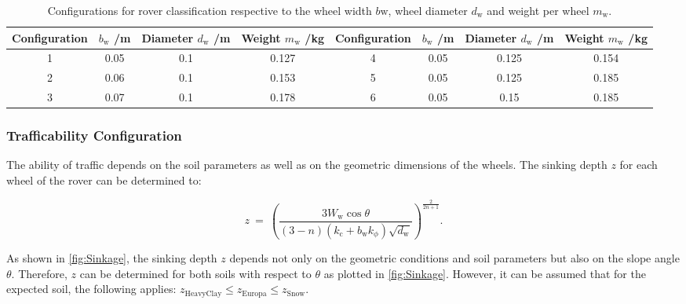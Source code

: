 \begin{table}[htb]
\centering
\caption{Configurations for rover classification respective to the wheel width \(b\text{w}\), wheel diameter \(d_\text{w}\) and weight per wheel \(m_\text{w}\).}
\begin{adjustbox}{max width=\textwidth}
\begin{tabular}{cccc|cccc}

	\toprule
		\multicolumn{1}{l}{Configuration} & \multicolumn{1}{c}{\(b_\text{w}\) /m} & \multicolumn{1}{c}{Diameter \(d_\text{w}\) /m} & \multicolumn{1}{c|}{Weight \(m_\text{w}\) /kg} &  \multicolumn{1}{l}{Configuration} & \multicolumn{1}{c}{\(b_\text{w}\) /m} & \multicolumn{1}{c}{Diameter \(d_\text{w}\) /m} & \multicolumn{1}{c}{Weight \(m_\text{w}\) /kg}  \\

	\midrule
		
		1	&	0.05	&	0.1		&	0.127		& 	4	&	0.05	&	0.125	&	0.154	\\
		2	&	0.06	&	0.1		&	0.153		&	5	&	0.05	&	0.125	&	0.185	\\
		3	&	0.07	&	0.1		&	0.178		& 	6	&	0.05	&	0.15	&	0.185	\\

	\bottomrule
	
\end{tabular}
\end{adjustbox}
\label{tab:Configurations}
\end{table}



\subsubsection*{Trafficability Configuration}
\label{sec:DP}

The ability of traffic depends on the soil parameters as well as on the geometric dimensions of the wheels. The sinking depth \(z\) for each wheel of the rover can be determined to:

\begin{equation}
	z \:  = \:	\left( \frac{3 W_\text{w} \cos \theta}{(3-n)(k_\text{c} + b_\text{w}k_\phi) \sqrt{d_\text{w}}} \right) ^{\frac{2}{2n+1}}	.
	\label{eq:Sinkage}
\end{equation}

As shown in \autoref{fig:Sinkage}, the sinking depth \(z\) depends not only on the geometric conditions and soil parameters but also on the slope angle \(\theta\). Therefore, \(z\) can be determined for both soils with respect to \(\theta\) as plotted in \autoref{fig:Sinkage}. However, it can be assumed that for the expected soil, the following applies: \( z_{\text{HeavyClay}} \leq z_{\text{Europa}} \leq z_{\text{Snow}} \).

